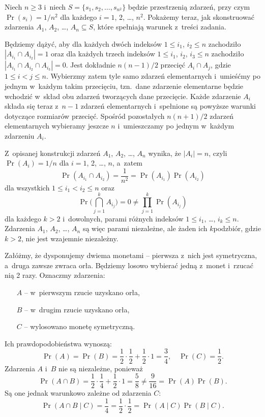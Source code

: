 \exercise %
Niech $n\ge3$ i~niech $S=\{s_1,s_2,\dots,s_{n^2}\}$ będzie przestrzenią zdarzeń, przy czym $\Pr(s_i)=1/n^2$ dla każdego $i=1$, 2, \dots, $n^2$.
Pokażemy teraz, jak skonstruować zdarzenia $A_1$, $A_2$, \dots, $A_n\subseteq S$, które spełniają warunek z~treści zadania.

Będziemy dążyć, aby dla każdych dwóch indeksów $1\le i_1$, $i_2\le n$ zachodziło $|A_{i_1}\cap A_{i_2}|=1$ oraz dla każdych trzech indeksów $1\le i_1$, $i_2$, $i_3\le n$ zachodziło $|A_{i_1}\cap A_{i_2}\cap A_{i_3}|=0$.
Jest dokładnie $n(n-1)/2$ przecięć $A_i\cap A_j$, gdzie $1\le i<j\le n$.
Wybierzmy zatem tyle samo zdarzeń elementarnych i~umieśćmy po jednym w~każdym takim przecięciu, tzn.\ dane zdarzenie elementarne będzie wchodzić w~skład obu zdarzeń tworzących dane przecięcie.
Każde zdarzenie $A_i$ składa się teraz z~$n-1$ zdarzeń elementarnych i~spełnione są powyższe warunki dotyczące rozmiarów przecięć.
Spośród pozostałych $n(n+1)/2$ zdarzeń elementarnych wybieramy jeszcze $n$ i~umieszczamy po jednym w~każdym zdarzeniu $A_i$.

Z~opisanej konstrukcji zdarzeń $A_1$, $A_2$, \dots, $A_n$ wynika, że $|A_i|=n$, czyli $\Pr(A_i)=1/n$ dla $i=1$, 2, \dots, $n$, a~zatem
\[
	\Pr(A_{i_1}\cap A_{i_2}) = \frac{1}{n^2} = \Pr(A_{i_1})\Pr(A_{i_2})
\]
dla wszystkich $1\le i_1<i_2\le n$ oraz
\[
	\Pr\biggl(\bigcap_{j=1}^kA_{i_j}\biggr) = 0 \ne \prod_{j=1}^k\Pr(A_{i_j})
\]
dla każdego $k>2$ i~dowolnych, parami różnych indeksów $1\le i_1$, \dots, $i_k\le n$.
Zdarzenia $A_1$, $A_2$, \dots, $A_n$ są więc parami niezależne, ale żaden ich $k$\nbhyphen podzbiór, gdzie $k>2$, nie jest wzajemnie niezależny.

\exercise %
Załóżmy, że dysponujemy dwiema monetami -- pierwsza z~nich jest symetryczna, a~druga zawsze zwraca orła.
Będziemy losowo wybierać jedną z~monet i~rzucać nią 2 razy.
Oznaczmy zdarzenia:
\begin{itemize}
	\item[$A$] -- w~pierwszym rzucie uzyskano orła,
	\item[$B$] -- w~drugim rzucie uzyskano orła,
	\item[$C$] -- wylosowano monetę symetryczną.
\end{itemize}
Ich prawdopodobieństwa wynoszą:
\[
	\Pr(A) = \Pr(B) = \frac{1}{2}\cdot\frac{1}{2}+\frac{1}{2}\cdot1 = \frac{3}{4}, \quad \Pr(C) = \frac{1}{2}.
\]
Zdarzenia $A$ i~$B$ nie są niezależne, ponieważ
\[
	\Pr(A\cap B) = \frac{1}{2}\cdot\frac{1}{4}+\frac{1}{2}\cdot1 = \frac{5}{8} \ne \frac{9}{16} = \Pr(A)\Pr(B).
\]
Są one jednak warunkowo zależne od zdarzenia $C$:
\[
	\Pr(A\cap B\mid C) = \frac{1}{4} = \frac{1}{2}\cdot\frac{1}{2} = \Pr(A\mid C)\Pr(B\mid C).
\]

